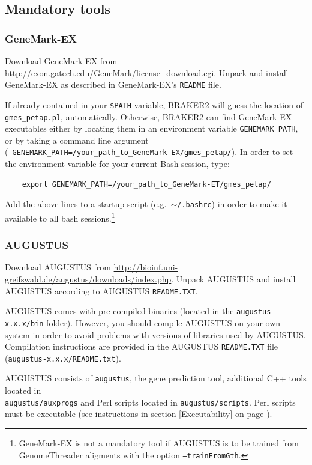 \documentclass[a4paper,10pt]{report}
\begin{document}
\subsection{Mandatory tools}

\subsubsection{GeneMark-EX}

Download GeneMark-EX from \url{http://exon.gatech.edu/GeneMark/license_download.cgi}.
 Unpack and install GeneMark-EX as described in GeneMark-EX's \texttt{README} file.

If already contained in your \texttt{\$PATH} variable, BRAKER2 will guess the location of \texttt{gmes\_petap.pl}, automatically. Otherwise, BRAKER2 can find GeneMark-EX executables either by locating them in an environment variable \texttt{GENEMARK\_PATH}, or by taking a command line argument\\ (\texttt{--GENEMARK\_PATH=/your\_path\_to\_GeneMark-EX/gmes\_petap/}). In order to set the environment variable for your current Bash session, type: 

    \begin{verbatim}
    export GENEMARK_PATH=/your_path_to_GeneMark-ET/gmes_petap/
\end{verbatim}

Add the above lines to a startup script (e.g.~\texttt{$\sim$/.bashrc}) in order to make it available to all bash sessions.\footnote{GeneMark-EX is not a mandatory tool if AUGUSTUS is to be trained from GenomeThreader aligments with the option \texttt{--trainFromGth}.}


\subsubsection{AUGUSTUS}

Download AUGUSTUS from \url{http://bioinf.uni-greifswald.de/augustus/downloads/index.php}.
 Unpack AUGUSTUS and install AUGUSTUS  according to AUGUSTUS \texttt{README.TXT}. 
 
 AUGUSTUS comes with pre-compiled binaries (located in the 
   \texttt{augustus-x.x.x/bin} folder). However, you should compile AUGUSTUS on your own system in order to avoid problems with versions of libraries used by AUGUSTUS. Compilation instructions are provided in the AUGUSTUS \texttt{README.TXT} file
   (\texttt{augustus-x.x.x/README.txt}).

AUGUSTUS consists of \texttt{augustus}, the gene prediction tool, additional C++ tools located in\\ \texttt{augustus/auxprogs} and Perl scripts located in \texttt{augustus/scripts}. Perl scripts must be executable (see instructions in section \ref{Executability} on page \pageref{Executability}). 
   
\end{document}
